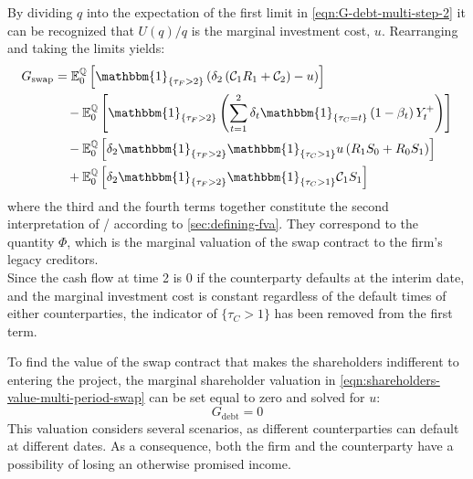 \documentclass[main.tex]{subfiles}
\begin{document}
        By dividing $q$ into the expectation of the first limit in \cref{eqn:G-debt-multi-step-2}
        it can be recognized that $U(q)/q$ is the marginal investment cost, $u$.
        Rearranging and taking the limits yields:
        \begin{align}
            G_{\text{swap}} &= 
            \mathbb{E}_{0}^{\rnmeasure}\left[
                \mathbbm{1}_{\{\tau_{F}>2\}}
                \left(
                    \delta_{2} \left(\mathcal{C}_{1} R_{1} + \mathcal{C}_{2}\right) - u
                \right)
            \right]
            \nonumber
            \\
            &\quad-
            \mathbb{E}_{0}^{\rnmeasure}\left[
                \mathbbm{1}_{\{\tau_{F}>2\}}
                \left(
                    \sum_{t=1}^{2} \delta_{t} \mathbbm{1}_{\{\tau_{C}=t\}}\left(1-\beta_t\right)Y_{t}^{+}
                \right)
            \right]
            \nonumber
            \\
            &\quad-
            \mathbb{E}_{0}^{\rnmeasure}\left[
                \delta_2 \mathbbm{1}_{\{\tau_{F}>2\}} \mathbbm{1}_{\{\tau_{C}>1\}} u \left(
                    R_{1} S_{0} + R_{0} S_{1}
                \right)
            \right]
            \nonumber
            \\
            &\quad+
            \mathbb{E}_{0}^{\rnmeasure}\left[
                \delta_2 \mathbbm{1}_{\{\tau_{F}>2\}} \mathbbm{1}_{\{\tau_{C}>1\}}
                \mathcal{C}_{1} S_1
            \right]
            \label{eqn:shareholders-value-multi-period-swap}
        \end{align}
        where the third and the fourth terms together constitute the second interpretation of \FVA/ according to \cref{sec:defining-fva}.
        They correspond to the quantity $\Phi$, which is the marginal valuation of the swap contract to the firm's legacy creditors.
        \\
        Since the cash flow at time 2 is 0 if the counterparty defaults at the interim date,
        and the marginal investment cost is constant regardless of the default times of either counterparties,
        the indicator of $\{\tau_{C}>1\}$ has been removed from the first term.

        To find the value of the swap contract that makes the shareholders indifferent to entering the project,
        the marginal shareholder valuation in 
        \cref{eqn:shareholders-value-multi-period-swap}
        can be set equal to zero and solved for $u$:
        \begin{equation*}
            G_{\text{debt}} = 0
        \end{equation*}
        \indent
        This valuation considers several scenarios, as different counterparties can default at different dates.
        As a consequence, both the firm and the counterparty have a possibility of losing an otherwise promised income.
\end{document}
